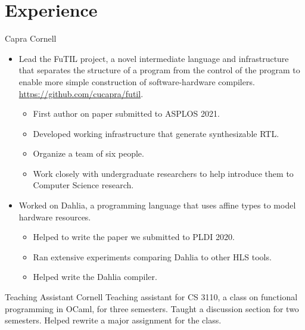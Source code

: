 \documentclass[10pt,a4paper,sans]{moderncv}        %
\begin{document}
\section{Experience}
{Capra}
{Cornell}
{}
{}
{
  \begin{itemize}
  \item Lead the FuTIL project, a novel intermediate language and infrastructure
    that separates the structure of a program from the control of the program to enable more
    simple construction of software-hardware compilers. \url{https://github.com/cucapra/futil}.
    \begin{itemize}
    \item First author on paper submitted to ASPLOS 2021.
    \item Developed working infrastructure that generate synthesizable RTL.
    \item Organize a team of six people.
      \item Work closely with undergraduate researchers to help introduce them
        to Computer Science research.
    \end{itemize}
  \item Worked on Dahlia, a programming language that uses affine types to model
    hardware resources.
    \begin{itemize}
    \item Helped to write the paper we submitted to PLDI 2020.
    \item Ran extensive experiments comparing Dahlia to other HLS tools.
    \item Helped write the Dahlia compiler.
    \end{itemize}
  \end{itemize}
}
%
{Teaching Assistant}
{Cornell}
{}
{}
{Teaching assistant for CS 3110, a class on functional programming in OCaml, for
  three semesters. Taught a discussion section for two semesters. Helped rewrite
  a major assignment for the class.}
\end{document}
